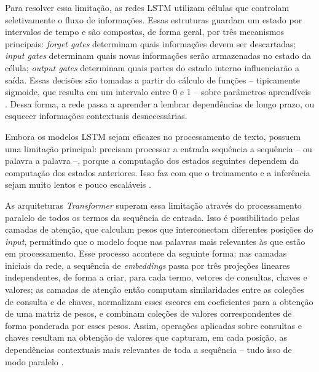 Para resolver essa limitação, as redes LSTM utilizam células que controlam seletivamente o fluxo de informações. Essas estruturas guardam um estado por intervalos de tempo e são compostas, de forma geral, por três mecanismos principais: \textit{forget gates} determinam quais informações devem ser descartadas; \textit{input gates} determinam quais novas informações serão armazenadas no estado da célula; \textit{output gates} determinam quais partes do estado interno influenciarão a saída. Essas decisões são tomadas a partir do cálculo de funções -- tipicamente sigmoide, que resulta em um intervalo entre 0 e 1 -- sobre parâmetros aprendíveis \cite{lstm}. Dessa forma, a rede passa a aprender a lembrar dependências de longo prazo, ou esquecer informações contextuais desnecessárias.

Embora os modelos LSTM sejam eficazes no processamento de texto, possuem uma limitação principal: precisam processar a entrada sequência a sequência -- ou palavra a palavra --, porque a computação dos estados seguintes dependem da computação dos estados anteriores. Isso faz com que o treinamento e a inferência sejam muito lentos e pouco escaláveis \cite{nlp2}.

As arquiteturas \textit{Transformer} superam essa limitação através do processamento paralelo de todos os termos da sequência de entrada. Isso é possibilitado pelas camadas de atenção, que calculam pesos que interconectam diferentes posições do \textit{input}, permitindo que o modelo foque nas palavras mais relevantes às que estão em processamento. Esse processo acontece da seguinte forma: nas camadas iniciais da rede, a sequência de \textit{embeddings} passa por três projeções lineares independentes, de forma a criar, para cada termo, vetores de consultas, chaves e valores; as camadas de atenção então computam similaridades entre as coleções de consulta e de chaves, normalizam esses escores em coeficientes para a obtenção de uma matriz de pesos, e combinam coleções de valores correspondentes de forma ponderada por esses pesos. Assim, operações aplicadas sobre consultas e chaves resultam na obtenção de valores que capturam, em cada posição, as dependências contextuais mais relevantes de toda a sequência -- tudo isso de modo paralelo \cite{transformer}.

